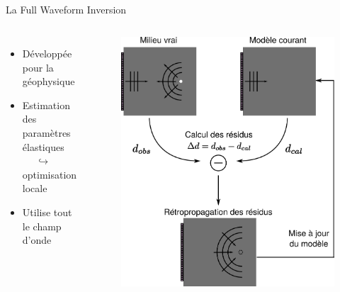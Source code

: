 \documentclass[10pt,xcolor=x11names,compress, notes=show]{beamer}%
\begin{document}
\subsection*{}
\begin{frame}{La Full Waveform Inversion}
	\begin{columns}
		\begin{itemize}
			\item Développée pour la géophysique\\[0.3cm]
			\item Estimation des paramètres élastiques\\ $~~~~~~\hookrightarrow$ optimisation locale\\[0.3cm]
			\item Utilise tout le champ d'onde\\[0.3cm]
		\end{itemize}
		\begin{figure}
			\centering
			\hspace{-0.3cm}\includegraphics[width=\textwidth]{img/schema_fwi2.png}
		\end{figure}
	\end{columns}
	
\end{frame}
\end{document}
